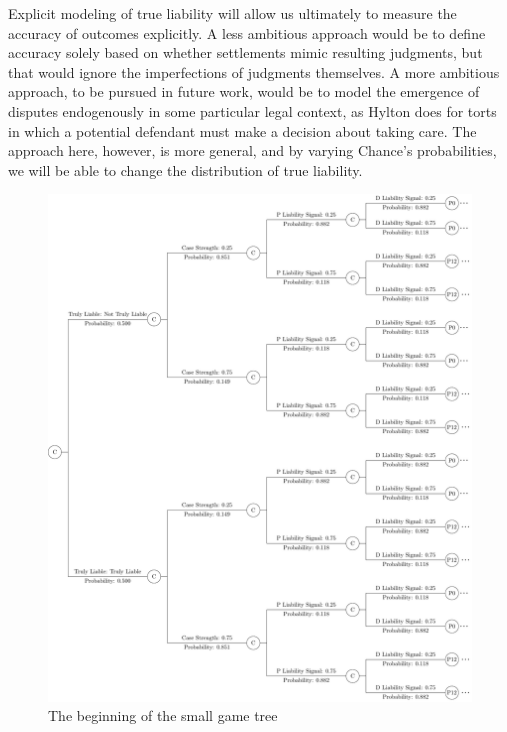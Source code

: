 \documentclass{article}
\begin{document}
Explicit modeling of true liability will allow us ultimately to measure the accuracy of outcomes explicitly. A less ambitious approach would be to define accuracy solely based on whether settlements mimic resulting judgments, but that would ignore the imperfections of judgments themselves. A more ambitious approach, to be pursued in future work, would be to model the emergence of disputes endogenously in some particular legal context, as Hylton \cite{hylton} does for torts in which a potential defendant must make a decision about taking care. The approach here, however, is more general, and by varying Chance's probabilities, we will be able to change the distribution of true liability. 

\begin{figure}[h!]
\centering
\includegraphics[scale=0.25, trim={0in 0in 0in 0in}, clip]{../Figures/game tree 2x2x2 beginning.pdf}
\caption{The beginning of the small game tree}
\label{fig:gametree2x2x2beginning}
\end{figure}
\end{document}
